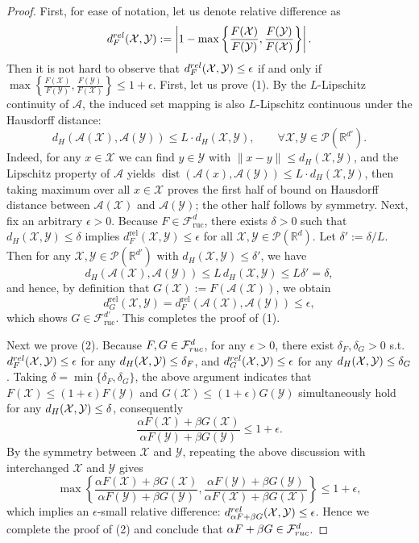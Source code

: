 \documentclass[10pt,a4paper]{amsart}
\newcommand{\cA}{\mathcal{A}}
\newcommand{\cF}{\mathcal{F}}
\newcommand{\cX}{\mathcal{X}}
\newcommand{\cY}{\mathcal{Y}}
\begin{document}
\begin{proof}
First, for ease of notation, let us denote relative difference as 
$$d_{F}^{\rm rel}(\cX,\cY): = \left|1-\max\left\{\frac{F(\cX)}{F(\cY)},\frac{F(\cY)}{F(\cX)}\right\}\right|.$$
Then it is not hard to observe that $d_{F}^{\rm rel}(\cX,\cY)\leq \epsilon$ if and only if  $\max\left\{\frac{F(\cX)}{F(\cY)},\frac{F(\cY)}{F(\cX)}\right\}\leq 1+\epsilon$. First, let us  prove (1). By the $L$-Lipschitz continuity of $\mathcal{A}$, the induced set mapping is also
$L$-Lipschitz continuous under the Hausdorff distance:
\[
    d_H(\mathcal{A}(\cX),\mathcal{A}(\cY))
    \le L\cdot d_H(\cX,\cY),
    \qquad \forall \cX,\cY \in \mathcal{P}(\mathbb{R}^{d'}).
\]
Indeed, for any $x\in\cX$ we can find $y\in\cY$ with $\|x-y\|\le d_H(\cX,\cY)$,
and the Lipschitz property of $\mathcal{A}$ yields
$\operatorname{dist}(\mathcal{A}(x),\mathcal{A}(\cY))
\le L\cdot d_H(\cX,\cY)$, then taking maximum over all $x\in\mathcal{X}$ proves the first half of bound on Hausdorff distance between $\cA(\cX)$ and $\cA(\cY)$; the other half  follows by symmetry.
Next, fix an arbitrary $\epsilon>0$.
Because $F\in\cF_{\mathrm{ruc}}^d$, there exists $\delta>0$ such that
$d_H(\cX,\cY)\le\delta$ implies
$d_F^{\mathrm{rel}}(\cX,\cY)\le\epsilon$ for all
$\cX,\cY\in\mathcal{P}(\mathbb{R}^d)$.
Let $\delta' := \delta/L$.
Then for any $\cX,\cY\in\mathcal{P}(\mathbb{R}^{d'})$ with
$d_H(\cX,\cY)\le\delta'$, we have
\[
    d_H(\mathcal{A}(\cX),\mathcal{A}(\cY))
    \le L\, d_H(\cX,\cY)
    \le L\delta' = \delta,
\]
and hence, by definition that $G(\cX):=F(\mathcal{A}(\cX))$, we obtain
\[
    d_G^{\mathrm{rel}}(\cX,\cY)
    = d_F^{\mathrm{rel}}(\mathcal{A}(\cX),\mathcal{A}(\cY))
    \le \epsilon,
\]
which shows $G\in\cF_{\mathrm{ruc}}^{d'}$.  This completes the proof of (1).

Next we prove (2). Because $F,G\in\cF_{\rm ruc}^{d}$, for any $\epsilon>0$, there exist $\delta_F,\delta_G>0$ s.t. 
$d_{F}^{\rm rel}(\cX,\cY)\leq\epsilon$ for any $d_{\rm H}(\cX,\cY)\leq \delta_F$, and $d_{G}^{\rm rel}(\cX,\cY)\leq\epsilon$ for any $d_{\rm H}(\cX,\cY)\leq \delta_G$. Taking $\delta = \min\{\delta_F,\delta_G\}$, the above argument indicates that 
$F(\cX)\leq (1+\epsilon)F(\cY)$ and $G(\cX)\leq (1+\epsilon)G(\cY)$ simultaneously hold for any $d_{\rm H}(\cX,\cY)\leq \delta$, consequently
$$\frac{\alpha F(\cX)+\beta G(\cX)}{\alpha F(\cY)+\beta G(\cY)}\leq 1+\epsilon.$$
By the symmetry between $\cX$ and $\cY$,   repeating the above discussion with interchanged $\cX$ and $\cY$ gives 
$$\max\left\{\frac{\alpha F(\cX)+\beta G(\cX)}{\alpha F(\cY)+\beta G(\cY)},\frac{\alpha F(\cY)+\beta G(\cY)}{\alpha F(\cX)+\beta G(\cX)}\right\}\leq 1+\epsilon,$$
which implies an $\epsilon$-small relative difference: $d_{\alpha F+\beta G}^{\rm rel}(\cX,\cY)\leq\epsilon$. Hence we complete  the proof of (2) and conclude that $\alpha F+\beta G\in \cF_{\rm ruc}^{d}$.  


\end{proof}
\end{document}
